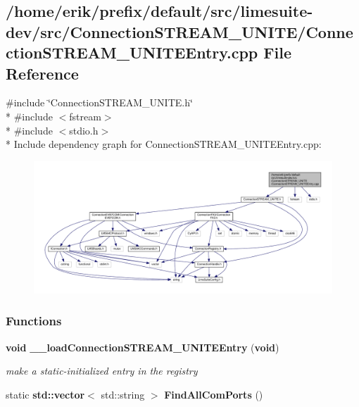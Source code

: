 \subsection{/home/erik/prefix/default/src/limesuite-\/dev/src/\+Connection\+S\+T\+R\+E\+A\+M\+\_\+\+U\+N\+I\+T\+E/\+Connection\+S\+T\+R\+E\+A\+M\+\_\+\+U\+N\+I\+T\+E\+Entry.cpp File Reference}
\label{ConnectionSTREAM__UNITEEntry_8cpp}
{\ttfamily \#include \char`\"{}Connection\+S\+T\+R\+E\+A\+M\+\_\+\+U\+N\+I\+T\+E.\+h\char`\"{}}\\*
{\ttfamily \#include $<$fstream$>$}\\*
{\ttfamily \#include $<$stdio.\+h$>$}\\*
Include dependency graph for Connection\+S\+T\+R\+E\+A\+M\+\_\+\+U\+N\+I\+T\+E\+Entry.\+cpp\+:
\nopagebreak
\begin{figure}[H]
\begin{center}
\leavevmode
\includegraphics[width=350pt]{df/d68/ConnectionSTREAM__UNITEEntry_8cpp__incl}
\end{center}
\end{figure}
\subsubsection*{Functions}
\begin{DoxyCompactItemize}
\item 
{\bf void} {\bf \+\_\+\+\_\+load\+Connection\+S\+T\+R\+E\+A\+M\+\_\+\+U\+N\+I\+T\+E\+Entry} ({\bf void})
\begin{DoxyCompactList}\small\item\em make a static-\/initialized entry in the registry \end{DoxyCompactList}\item 
static {\bf std\+::vector}$<$ std\+::string $>$ {\bf Find\+All\+Com\+Ports} ()
\end{DoxyCompactItemize}


